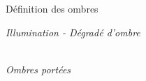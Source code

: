 \documentclass{beamer}
\begin{document}
\begin{frame}{Définition des ombres}
\begin{center}
\begin{minipage}[c]{0.45\linewidth}
\begin{center}
 		\textit{Illumination - Dégradé d'ombre}
    \end{center}
    \end{minipage}
    \hspace{0.2cm}
    \begin{minipage}[c]{0.45\linewidth}
    \begin{center}
    	\\
 		\textit{Ombres portées}
    \end{center}
    \end{minipage}
\end{center}


\end{frame}
\end{document}
